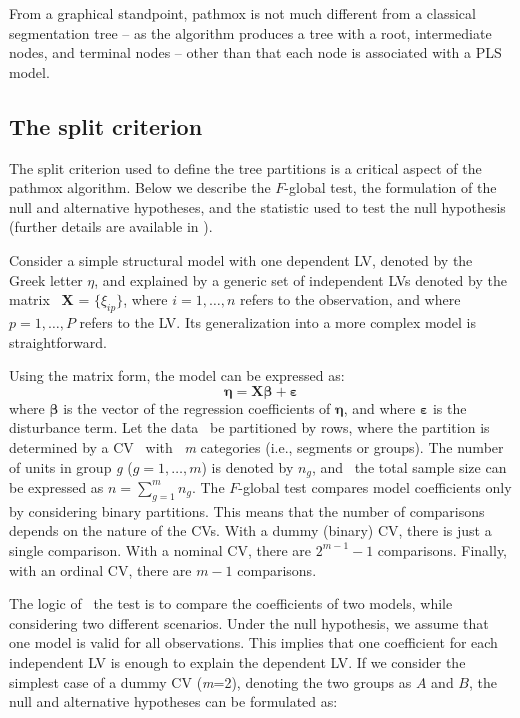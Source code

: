 From a graphical standpoint, pathmox is not much different from a classical segmentation tree -- as the algorithm produces a tree with a root, intermediate nodes, and terminal nodes -- other than that each node is associated with a PLS model. 

\subsection{The split criterion}

The split criterion used to define the tree partitions is a critical aspect of the pathmox algorithm. Below we describe the $F$-global test, the formulation of the null and alternative hypotheses, and the statistic used to test the null hypothesis (further details are available in \citealp{Lamberti16}).

Consider a simple structural model with one dependent LV, denoted by the Greek letter \textbf{$\eta$}, and explained by a generic set of independent LVs denoted by the matrix  \textbf{X} = $\{\xi_{ip}\}$, where $i = 1, \ldots, n$ refers to the observation, and where $p = 1, \ldots, P$ refers to the LV. Its generalization into a more complex model is straightforward. 

Using the matrix form, the model can be expressed as: 
\begin{equation}
\label{eq1}
\boldsymbol{\eta} = \textbf{X}\boldsymbol{\beta} + \boldsymbol{\varepsilon}
\end{equation}
where $\boldsymbol{\beta}$ is the vector  of the regression coefficients of $\boldsymbol{\eta}$, and where $\boldsymbol{\varepsilon}$ is the disturbance term. Let the data  be partitioned by rows, where the partition is determined by a CV  with  \textit{m} categories (i.e., segments or groups). The number of units in group \textit{g} ($g=1,\ldots, m$) is denoted by $n_g$, and  the total sample size can be expressed as $n=\sum_{g=1}^m n_g$.
The $F$-global test compares model coefficients only by considering binary partitions. This means that the number of comparisons depends on the nature of the CVs. With a dummy (binary) CV, there is just a single comparison.  With a nominal CV, there are $2^{m-1}-1$ comparisons. Finally, with an ordinal CV, there are $m-1$ comparisons.

The logic of  the test is to compare the coefficients of two models, while considering two different scenarios. Under the null hypothesis, we assume that one model is valid for all observations. This implies  that one coefficient for each independent LV is enough to explain the dependent LV.  If we  consider the simplest case of a dummy CV (\textit{m}=2), denoting the two groups as $A$ and $B$, the null and alternative hypotheses can be formulated as:

